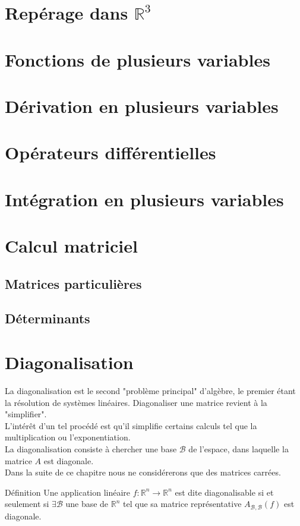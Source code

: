 \chapter{Repérage dans $\mathbb{R}^3$}
\chapter{Fonctions de plusieurs variables}
\chapter{Dérivation en plusieurs variables}
\chapter{Opérateurs différentielles}
\chapter{Intégration en plusieurs variables}
\chapter{Calcul matriciel}
\section{Matrices particulières}
\section{Déterminants}
\chapter{Diagonalisation}
  La diagonalisation est le second "problème principal" d'algèbre, le premier étant la résolution de systèmes
  linéaires.
Diagonaliser une matrice revient à la "simplifier".\\
L'intérêt d'un tel procédé est qu'il simplifie certains calculs tel que la multiplication ou l'exponentiation.\\
La diagonalisation consiste à chercher une base $\mathscr{B}$ de l'espace, dans laquelle la matrice $A$ est diagonale.\\
Dans la suite de ce chapitre nous ne considérerons que des matrices carrées.\\
\begin{bclogo}[couleur=blue!30,couleurBord=blue,arrondi=0.1,logo=\bcbook,ombre=true]{Définition}
Une application linéaire $f:\mathbb{R}^{n}\rightarrow\mathbb{R}^{n}$  est dite diagonalisable si et seulement si $\exists \mathscr{B}$ une base de $\mathbb{R}^{n}$ tel que sa matrice représentative $A_{\mathscr{B},\mathscr{B}}(f)$ est diagonale.
\end{bclogo}
